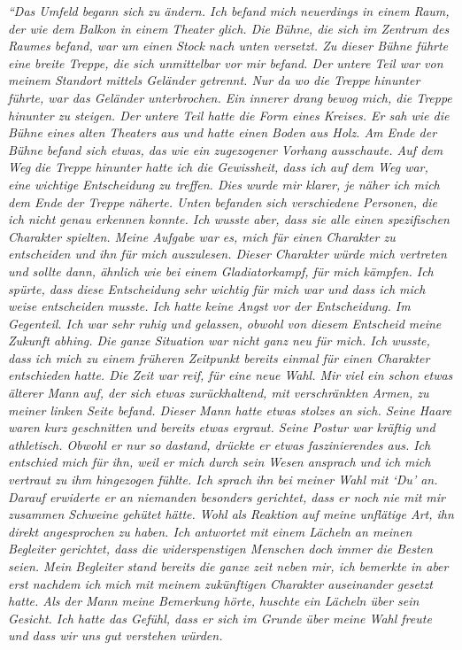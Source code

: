 \textit{\textquotedblleft Das Umfeld begann sich zu ändern. Ich befand mich neuerdings in einem Raum, der wie dem Balkon in einem Theater glich. Die Bühne, die sich im Zentrum des Raumes befand, war um einen Stock nach unten versetzt. Zu dieser Bühne führte eine breite Treppe, die sich unmittelbar vor mir befand. Der untere Teil war von meinem Standort mittels Geländer getrennt. Nur da wo die Treppe hinunter führte, war das Geländer unterbrochen. Ein innerer drang bewog mich, die Treppe hinunter zu steigen. Der untere Teil hatte die Form eines Kreises. Er sah wie die Bühne eines alten Theaters aus und hatte einen Boden aus Holz. Am Ende der Bühne befand sich etwas, das wie ein zugezogener Vorhang ausschaute. Auf dem Weg die Treppe hinunter hatte ich die Gewissheit, dass ich auf dem Weg war, eine wichtige Entscheidung zu treffen. Dies wurde mir klarer, je näher ich mich dem Ende der Treppe näherte. \newline 
Unten befanden sich verschiedene Personen, die ich nicht genau erkennen konnte. Ich wusste aber, dass sie alle einen spezifischen Charakter spielten. Meine Aufgabe war es, mich für einen Charakter zu entscheiden und ihn für mich auszulesen. Dieser Charakter würde mich vertreten und sollte dann, ähnlich wie bei einem Gladiatorkampf, für mich kämpfen. Ich spürte, dass diese Entscheidung sehr wichtig für mich war und dass ich mich weise entscheiden musste. Ich hatte keine Angst vor der Entscheidung. Im Gegenteil. Ich war sehr ruhig und gelassen, obwohl von diesem Entscheid meine Zukunft abhing. Die ganze Situation war nicht ganz neu für mich. Ich wusste, dass ich mich zu einem früheren Zeitpunkt bereits einmal für einen Charakter entschieden hatte. \newline 
Die Zeit war reif, für eine neue Wahl. Mir viel ein schon etwas älterer Mann auf, der sich etwas zurückhaltend, mit verschränkten Armen, zu meiner linken Seite befand. Dieser Mann hatte etwas stolzes an sich. Seine Haare waren kurz geschnitten und bereits etwas ergraut. Seine Postur war kräftig und athletisch. Obwohl er nur so dastand, drückte er etwas faszinierendes aus. Ich entschied mich für ihn, weil er mich durch sein Wesen ansprach und ich mich vertraut zu ihm hingezogen fühlte. Ich sprach ihn bei meiner Wahl mit ‘Du’ an. Darauf  erwiderte er an niemanden besonders gerichtet, dass er noch nie mit mir zusammen Schweine gehütet hätte. Wohl als Reaktion auf meine unflätige Art, ihn direkt angesprochen zu haben. Ich antwortet mit einem Lächeln an meinen Begleiter gerichtet, dass die widerspenstigen Menschen doch immer die Besten seien. Mein Begleiter stand bereits die ganze zeit neben mir, ich bemerkte in aber erst nachdem ich mich mit meinem zukünftigen Charakter auseinander gesetzt hatte. Als der Mann meine Bemerkung hörte, huschte ein Lächeln über sein Gesicht. Ich hatte das Gefühl, dass er sich im Grunde über meine Wahl freute und dass wir uns gut verstehen würden. \newline 
}
